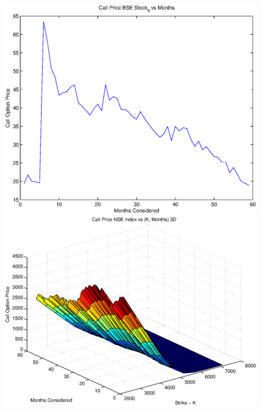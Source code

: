 \documentclass{article}
\begin{document}
\includegraphics[width=\textwidth]{Call_Price_BSE_Stock_9_vs_Months} \\

\includegraphics[width=\textwidth]{Call_Price_NSE_Index_vs_(K,_Months)_3D} \\
\end{document}
